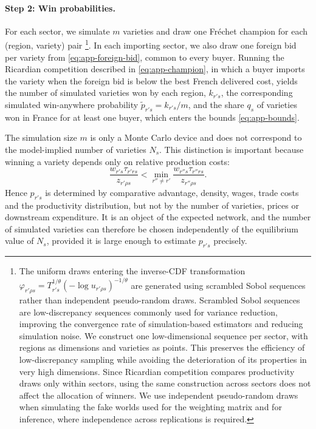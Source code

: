\paragraph{Step 2: Win probabilities.}
For each sector, we simulate $m$ varieties and draw one Fréchet champion for each (region, variety) pair \footnote{The uniform draws entering the inverse-CDF transformation $\varphi_{r'\rho s}=T_{r's}^{1/\theta}(-\log u_{r'\rho s})^{-1/\theta}$ are generated using scrambled Sobol sequences rather than independent pseudo-random draws. Scrambled Sobol sequences are low-discrepancy sequences commonly used for variance reduction, improving the convergence rate of simulation-based estimators and reducing simulation noise. We construct one low-dimensional sequence per sector, with regions as dimensions and varieties as points. This preserves the efficiency of low-discrepancy sampling while avoiding the deterioration of its properties in very high dimensions. Since Ricardian competition compares productivity draws only within sectors, using the same construction across sectors does not affect the allocation of winners. We use independent pseudo-random draws when simulating the fake worlds used for the weighting matrix and for inference, where independence across replications is required.
}. In each importing sector, we also draw one foreign bid per variety from \eqref{eq:app-foreign-bid}, common to every buyer. Running the Ricardian competition described in \eqref{eq:app-champion}, in which a buyer imports the variety when the foreign bid is below the best French delivered cost, yields the number of simulated varieties won by each region, $k_{r's}$, the corresponding simulated win-anywhere probability $\tilde p_{r's}=k_{r's}/m$, and the share $q_s$ of varieties won in France for at least one buyer, which enters the bounds \eqref{eq:app-bounds}.

The simulation size $m$ is only a Monte Carlo device and does not correspond to the model-implied number of varieties $N_s$. This distinction is important because winning a variety depends only on relative production costs: $$ \frac{w_{r's}\tau_{r'rs}}{z_{r'\rho s}} < \min_{r''\neq r'} \frac{w_{r''s}\tau_{r''rs}}{z_{r''\rho s}} . $$ Hence $p_{r's}$ is determined by comparative advantage, density, wages, trade costs and the productivity distribution, but not by the number of varieties, prices or downstream expenditure. It is an object of the expected network, and the number of simulated varieties can therefore be chosen independently of the equilibrium value of $N_s$, provided it is large enough to estimate $p_{r's}$ precisely.

